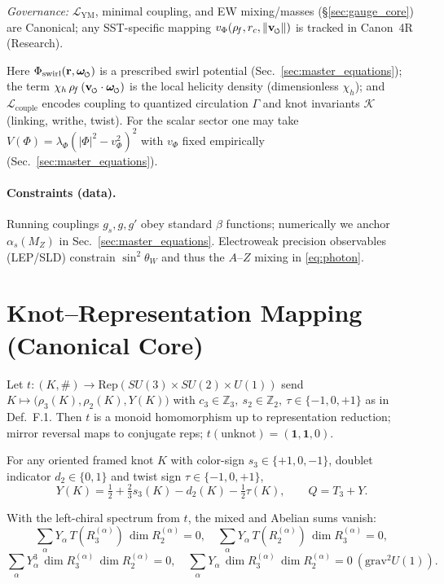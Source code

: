 \documentclass[11pt]{article}
\begin{document}
\noindent
\textit{Governance:} $\mathcal{L}_{\text{YM}}$, minimal coupling, and EW mixing/masses (\S\ref{sec:gauge_core}) are Canonical; any SST-specific mapping $v_\Phi(\rhof,\rc,\vnorm)$ is tracked in Canon~4R (Research).

Here $\Phi_{\text{swirl}}(\mathbf{r},\omegas)$ is a prescribed swirl potential (Sec.~\ref{sec:master_equations});
the term $\chi_h\,\rhof\,(\vswirl\cdot\omegas)$ is the local helicity density (dimensionless $\chi_h$); and $\mathcal{L}_{\text{couple}}$ encodes
coupling to quantized circulation $\Gamma$ and knot invariants $\mathcal{K}$ (linking, writhe, twist).
For the scalar sector one may take $V(\Phi)=\lambda_\Phi (|\Phi|^2 - v_\Phi^2)^2$ with
$v_\Phi$ fixed empirically (Sec.~\ref{sec:master_equations}).
\paragraph{Constraints (data).}
Running couplings $g_s,g,g'$ obey standard $\beta$ functions; numerically we anchor
$\alpha_s(M_Z)$ in Sec.~\ref{sec:master_equations}. Electroweak precision observables
(LEP/SLD) constrain $\sin^2\theta_W$ and thus the $A$–$Z$ mixing in \eqref{eq:photon}.


\section{Knot–Representation Mapping (Canonical Core)}
\begin{theorem}
	Let $t:(K,\#)\to \mathrm{Rep}(SU(3)\times SU(2)\times U(1))$ send
	$K\mapsto\big(\rho_3(K),\rho_2(K),Y(K)\big)$ with
	$c_3\in\mathbb{Z}_3,\ s_2\in\mathbb{Z}_2,\ \tau\in\{-1,0,+1\}$ as in Def.~F.1.
	Then $t$ is a monoid homomorphism up to representation reduction; mirror reversal maps to conjugate reps; $t(\text{unknot})=(\mathbf{1},\mathbf{1},0)$.
\end{theorem}

\begin{definition}
	For any oriented framed knot $K$ with color-sign $s_3\in\{+1,0,-1\}$,
	doublet indicator $d_2\in\{0,1\}$ and twist sign $\tau\in\{-1,0,+1\}$,
	\[
		Y(K)=\tfrac{1}{2}+\tfrac{2}{3}s_3(K)-d_2(K)-\tfrac{1}{2}\tau(K),
		\qquad Q=T_3+Y .
	\]
\end{definition}

\begin{theorem}
	With the left-chiral spectrum from $t$, the mixed and Abelian sums vanish:
	\[
		\sum_\alpha Y_\alpha\,T(R^{(\alpha)}_3)\,\dim R^{(\alpha)}_2=0,\quad
		\sum_\alpha Y_\alpha\,T(R^{(\alpha)}_2)\,\dim R^{(\alpha)}_3=0,
	\]
	\[
		\sum_\alpha Y_\alpha^3\,\dim R^{(\alpha)}_3\,\dim R^{(\alpha)}_2=0,\quad
		\sum_\alpha Y_\alpha\,\dim R^{(\alpha)}_3\,\dim R^{(\alpha)}_2=0\ (\text{grav}^2U(1)).
	\]
\end{theorem}
\end{document}
